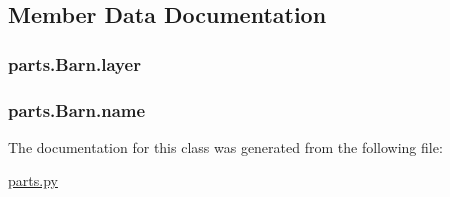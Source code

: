 \subsection{Member Data Documentation}
\hypertarget{classparts_1_1_barn_a35781429e48ee8c1b0ed660a9fdf883b}{}
\subsubsection[{layer}]{\setlength{\rightskip}{0pt plus 5cm}parts.\+Barn.\+layer}\label{classparts_1_1_barn_a35781429e48ee8c1b0ed660a9fdf883b}
\hypertarget{classparts_1_1_barn_a14d9cf3e1d2270a2d5923d9c0779dee7}{}
\subsubsection[{name}]{\setlength{\rightskip}{0pt plus 5cm}parts.\+Barn.\+name}\label{classparts_1_1_barn_a14d9cf3e1d2270a2d5923d9c0779dee7}


The documentation for this class was generated from the following file\+:\begin{DoxyCompactItemize}
\item 
\hyperlink{parts_8py}{parts.\+py}\end{DoxyCompactItemize}
